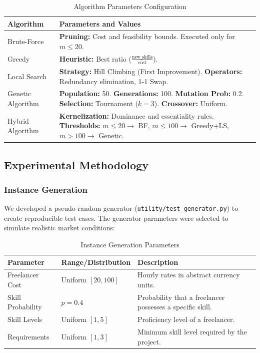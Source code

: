 \begin{description}
\begin{table}[H]
\centering
\caption{Algorithm Parameters Configuration}
\label{tab:algorithm-parameters}
\begin{tabular}{@{}lp{8cm}@{}}
\toprule
\textbf{Algorithm} & \textbf{Parameters and Values} \\
\midrule
Brute-Force & \textbf{Pruning:} Cost and feasibility bounds. Executed only for $m \le 20$. \\
Greedy & \textbf{Heuristic:} Best ratio ($\frac{\text{new\_skills}}{\text{cost}}$). \\
Local Search & \textbf{Strategy:} Hill Climbing (First Improvement). \textbf{Operators:} Redundancy elimination, 1-1 Swap. \\
Genetic Algorithm & \textbf{Population:} 50. \textbf{Generations:} 100. \textbf{Mutation Prob:} 0.2. \textbf{Selection:} Tournament ($k=3$). \textbf{Crossover:} Uniform. \\
Hybrid Algorithm & \textbf{Kernelization:} Dominance and essentiality rules. \textbf{Thresholds:} $m \le 20 \to$ BF, $m \le 100 \to$ Greedy+LS, $m > 100 \to$ Genetic. \\
\bottomrule
\end{tabular}
\end{table}
\end{description}

\subsection{Experimental Methodology}
\label{subsec:experimental-methodology}

\subsubsection{Instance Generation}
We developed a pseudo-random generator (\texttt{utility/test\_generator.py}) to create reproducible test cases. The generator parameters were selected to simulate realistic market conditions:

\begin{table}[H]
\centering
\caption{Instance Generation Parameters}
\label{tab:instance-parameters}
\begin{tabular}{@{}lll@{}}
\toprule
\textbf{Parameter} & \textbf{Range/Distribution} & \textbf{Description} \\
\midrule
Freelancer Cost & Uniform $[20, 100]$ & Hourly rates in abstract currency units. \\
Skill Probability & $p=0.4$ & Probability that a freelancer possesses a specific skill. \\
Skill Levels & Uniform $[1, 5]$ & Proficiency level of a freelancer. \\
Requirements & Uniform $[1, 3]$ & Minimum skill level required by the project. \\
\bottomrule
\end{tabular}
\end{table}

